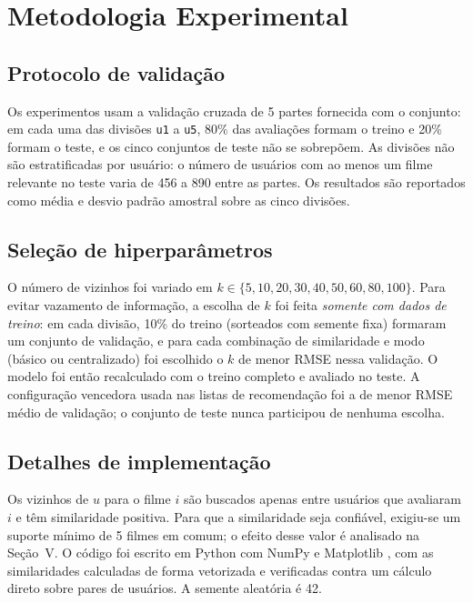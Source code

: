 \documentclass[conference]{IEEEtran}
\begin{document}
\section{Metodologia Experimental}
\subsection{Protocolo de valida\c{c}\~ao}
Os experimentos usam a valida\c{c}\~ao cruzada de 5 partes fornecida com o conjunto: em cada uma das divis\~oes \texttt{u1} a \texttt{u5}, 80\% das avalia\c{c}\~oes formam o treino e 20\% formam o teste, e os cinco conjuntos de teste n\~ao se sobrep\~oem. As divis\~oes n\~ao s\~ao estratificadas por usu\'ario: o n\'umero de usu\'arios com ao menos um filme relevante no teste varia de 456 a 890 entre as partes. Os resultados s\~ao reportados como m\'edia e desvio padr\~ao amostral sobre as cinco divis\~oes.

\subsection{Sele\c{c}\~ao de hiperpar\^ametros}
O n\'umero de vizinhos foi variado em $k\in\{5,10,20,30,40,50,60,80,100\}$. Para evitar vazamento de informa\c{c}\~ao, a escolha de $k$ foi feita \emph{somente com dados de treino}: em cada divis\~ao, 10\% do treino (sorteados com semente fixa) formaram um conjunto de valida\c{c}\~ao, e para cada combina\c{c}\~ao de similaridade e modo (b\'asico ou centralizado) foi escolhido o $k$ de menor RMSE nessa valida\c{c}\~ao. O modelo foi ent\~ao recalculado com o treino completo e avaliado no teste. A configura\c{c}\~ao vencedora usada nas listas de recomenda\c{c}\~ao foi a de menor RMSE m\'edio de valida\c{c}\~ao; o conjunto de teste nunca participou de nenhuma escolha.

\subsection{Detalhes de implementa\c{c}\~ao}
Os vizinhos de $u$ para o filme $i$ s\~ao buscados apenas entre usu\'arios que avaliaram $i$ e t\^em similaridade positiva. Para que a similaridade seja confi\'avel, exigiu-se um suporte m\'inimo de 5 filmes em comum; o efeito desse valor \'e analisado na Se\c{c}\~ao~V. O c\'odigo foi escrito em Python com NumPy \cite{harris2020} e Matplotlib \cite{hunter2007}, com as similaridades calculadas de forma vetorizada e verificadas contra um c\'alculo direto sobre pares de usu\'arios. A semente aleat\'oria \'e 42.
\end{document}
